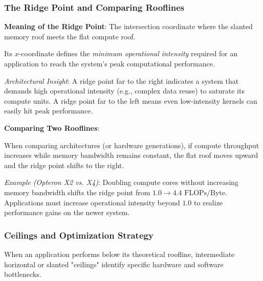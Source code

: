 \subsubsection{The Ridge Point and Comparing Rooflines}
\begin{dashlist}
    \item \textbf{Meaning of the Ridge Point}: The intersection coordinate where the slanted memory roof meets the flat compute roof.
    \begin{dashlist}
        \item Its $x$-coordinate defines the \textit{minimum operational intensity} required for an application to reach the system's peak computational performance.
        \item \textit{Architectural Insight}: A ridge point far to the right indicates a system that demands high operational intensity (e.g., complex data reuse) to saturate its compute units. A ridge point far to the left means even low-intensity kernels can easily hit peak performance.
    \end{dashlist}
    \item \textbf{Comparing Two Rooflines}:
    \begin{dashlist}
        \item When comparing architectures (or hardware generations), if compute throughput increases while memory bandwidth remains constant, the flat roof moves upward and the ridge point shifts to the right.
        \item \textit{Example (Opteron X2 vs. X4)}: Doubling compute cores without increasing memory bandwidth shifts the ridge point from $1.0 \to 4.4 \text{ FLOPs/Byte}$. Applications must increase operational intensity beyond $1.0$ to realize performance gains on the newer system.
    \end{dashlist}
\end{dashlist}

\subsubsection{Ceilings and Optimization Strategy}
When an application performs below its theoretical roofline, intermediate horizontal or slanted "ceilings" identify specific hardware and software bottlenecks.

